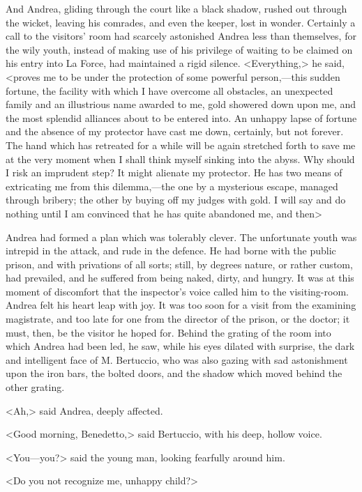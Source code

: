  And Andrea, gliding through the court like a black shadow, rushed out through the wicket, leaving his comrades, and even the keeper, lost in wonder. Certainly a call to the visitors' room had scarcely astonished Andrea less than themselves, for the wily youth, instead of making use of his privilege of waiting to be claimed on his entry into La Force, had maintained a rigid silence.  <Everything,> he said, <proves me to be under the protection of some powerful person,—this sudden fortune, the facility with which I have overcome all obstacles, an unexpected family and an illustrious name awarded to me, gold showered down upon me, and the most splendid alliances about to be entered into. An unhappy lapse of fortune and the absence of my protector have cast me down, certainly, but not forever. The hand which has retreated for a while will be again stretched forth to save me at the very moment when I shall think myself sinking into the abyss. Why should I risk an imprudent step? It might alienate my protector. He has two means of extricating me from this dilemma,—the one by a mysterious escape, managed through bribery; the other by buying off my judges with gold. I will say and do nothing until I am convinced that he has quite abandoned me, and then\longdash> 

 Andrea had formed a plan which was tolerably clever. The unfortunate youth was intrepid in the attack, and rude in the defence. He had borne with the public prison, and with privations of all sorts; still, by degrees nature, or rather custom, had prevailed, and he suffered from being naked, dirty, and hungry. It was at this moment of discomfort that the inspector's voice called him to the visiting-room. Andrea felt his heart leap with joy. It was too soon for a visit from the examining magistrate, and too late for one from the director of the prison, or the doctor; it must, then, be the visitor he hoped for. Behind the grating of the room into which Andrea had been led, he saw, while his eyes dilated with surprise, the dark and intelligent face of M. Bertuccio, who was also gazing with sad astonishment upon the iron bars, the bolted doors, and the shadow which moved behind the other grating. 

 <Ah,> said Andrea, deeply affected. 

 <Good morning, Benedetto,> said Bertuccio, with his deep, hollow voice. 

 <You—you?> said the young man, looking fearfully around him. 

 <Do you not recognize me, unhappy child?> 

